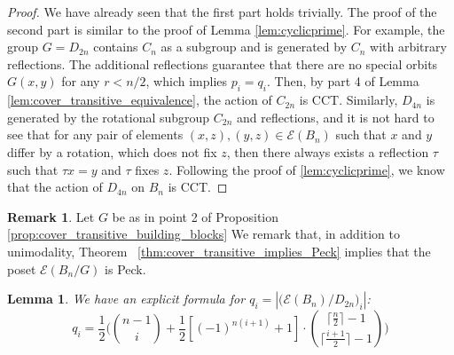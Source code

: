 \documentclass[10 pt]{amsart}
\theoremstyle{plain}
\newtheorem{lem}[thm]{Lemma}
\theoremstyle{definition}
\newtheorem{rem}[thm]{Remark}
\theoremstyle{remark}
\numberwithin{equation}{section}
\begin{document}
\building*

\begin{proof}
We have already seen that the first part holds trivially. The proof of the second part is similar to the proof of Lemma \ref{lem:cyclicprime}. For example, the group $G = D_{2n}$ contains $C_n$ as a subgroup and is generated by $C_n$ with arbitrary reflections. The additional reflections guarantee that there are no special orbits $G(x , y)$ for any $r < n/2$, which implies $p_i = q_i$. Then, by part 4 of Lemma \ref{lem:cover_transitive_equivalence}, the action of $C_{2n}$ is CCT. Similarly, $D_{4n}$ is generated by the rotational subgroup $C_{2n}$ and reflections, and it is not hard to see that for any pair of elements $(x, z), (y, z) \in \mathcal E(B_n)$ such that $x$ and $y$ differ by a rotation, which does not fix $z$, then there always exists a reflection $\tau$ such that $\tau x = y$ and $\tau$ fixes $z$.
 Following the proof of \ref{lem:cyclicprime}, we know that the action of $D_{4n}$ on $B_n$ is CCT.
\end{proof}

\begin{rem}
Let $G$ be as in point 2 of Proposition \ref{prop:cover_transitive_building_blocks} We remark that, in addition to unimodality, Theorem ~\ref{thm:cover_transitive_implies_Peck} implies that the poset $\mathcal E(B_n/G)$ is Peck.
\end{rem}


\begin{lem}{\label{dihedral002}}
 We have an explicit formula for $q_i = |\big(\mathcal E (B_n)/D_{2n} \big)_i|$:
 $$q_i = \frac{1}{2} \Big( {n-1 \choose i } + \frac{1}{2} [(-1)^{n(i+1)}+1] \cdot { \lceil \frac n 2\rceil -1  \choose \lceil \frac{i+1} 2 \rceil - 1}  \Big)$$
\end{lem}
\end{document}
